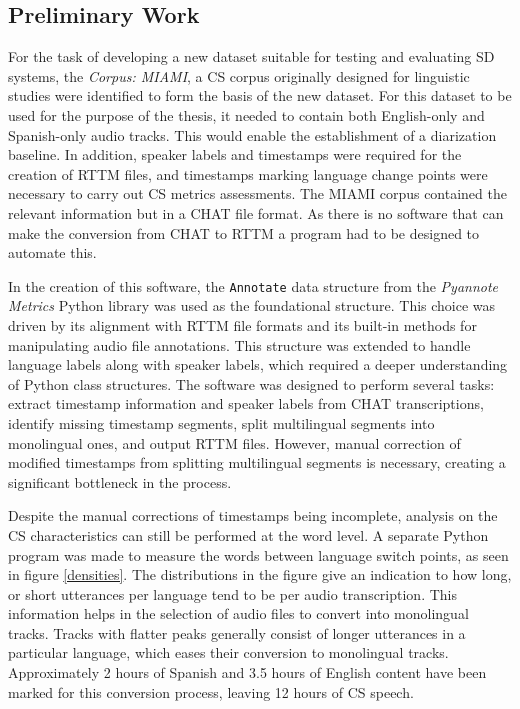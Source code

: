 \documentclass[11pt, a4paper]{report}
\begin{document}
\subsection*{Preliminary Work}
For the task of developing a new dataset suitable for testing and evaluating SD 
systems, the \textit{Corpus: MIAMI}, a CS corpus originally designed for linguistic 
studies were identified to form the basis of the new dataset. 
For this dataset to be used for the purpose of the thesis, it needed to 
contain both English-only and Spanish-only audio tracks. This would 
enable the establishment of a diarization baseline. In addition, 
speaker labels and timestamps were required for the creation of RTTM files, 
and timestamps marking language change points were necessary to carry out 
CS metrics assessments. The MIAMI corpus contained the relevant information but 
in a CHAT file format. As there is no software that can make the conversion from
CHAT to RTTM a program had to be designed to automate this.

\vspace*{10pt}
In the creation of this software, the \lstinline{Annotate} data structure from 
the \textit{Pyannote Metrics} Python library was used as the foundational 
structure. This choice was driven by its alignment with RTTM file formats 
and its built-in methods for manipulating audio file annotations. This structure 
was extended to handle language labels along with speaker labels, which required 
a deeper understanding of Python class structures. The software was designed to 
perform several tasks: extract timestamp information and speaker labels from CHAT 
transcriptions, identify missing timestamp segments, split multilingual segments 
into monolingual ones, and output RTTM files. However, manual correction of modified
 timestamps from splitting multilingual segments is necessary, creating a significant 
bottleneck in the process. 

\vspace*{10pt}
Despite the manual corrections of timestamps being incomplete, analysis on the CS 
characteristics can still be performed at the word level. A separate Python program 
was made to measure the words between language switch points, as seen in 
figure \ref*{densities}. The distributions in the figure give an indication to 
how long, or short utterances per language tend to be per audio transcription.
This information helps in the selection of audio files to convert into monolingual 
tracks. Tracks with flatter peaks generally consist of longer utterances in a 
particular language, which eases their conversion to monolingual tracks. 
Approximately 2 hours of Spanish and 3.5 hours of English content 
have been marked for this conversion process, leaving 12 hours of CS speech.
\end{document}
